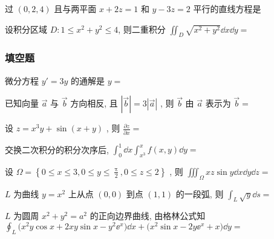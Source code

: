 \begin{ti}
	过 $(0,2,4)$ 且与两平面 $x+2z=1$ 和 $y-3z=2$ 平行的直线方程是 \kuo
\end{ti}

\begin{ti}
	设积分区域 $D: 1 \leqslant x^2 + y^2 \leqslant 4$, 则二重积分 $\iint_D \sqrt{x^2 + y^2} \dd{x} \dd{y} = $ \kuo
\end{ti}

\subsubsection{填空题}
\begin{ti}
	微分方程 $y'=3y$ 的通解是 $y=$ \hua{}
\end{ti}

\begin{ti}
	已知向量 $\vec{a}$ 与 $\vec{b}$ 方向相反, 且 $\left|\vec{b}\right|=3|\vec{a}|$ , 则 $\vec{b}$ 由 $\vec{a}$ 表示为 $\vec{b}=$ \hua{}
\end{ti}

\begin{ti}
	设 $z=x^3 y+\sin(x+y)$ , 则 $\frac{\partial z}{\partial x}=$ \hua{}
\end{ti}

\begin{ti}
	交换二次积分的积分次序后, $\int_0^1 \dd{x}\int_{x^3}^{x} f(x,y)\dd{y}=$ \hua{}
\end{ti}

\begin{ti}
	设 $\Omega=\left\{ 0\leqslant x\leqslant 3, 0\leqslant y\leqslant \frac{\uppi}{2}, 0\leqslant z\leqslant 2 \right\}$ , 则 $\iiint_{\Omega}xz\sin y\dd{x}\dd{y}\dd{z}=$ \hua{}
\end{ti}

\begin{ti}
	$L$ 为曲线 $y=x^2$ 上从点 $(0,0)$ 到点 $(1,1)$ 的一段弧, 则 $\int_{L}\sqrt{y}\dd{s}=$ \hua{}
\end{ti}

\begin{ti}
	$L$ 为圆周 $x^2+y^2=a^2$ 的正向边界曲线, 由格林公式知 $\oint_{L} \bigl( x^2y\cos x+2xy\sin x-y^2 \ee^x \bigr)\dd{x} + \bigl( x^2\sin x-2y\ee^x + x \bigr)\dd{y}=$ \hua{}
\end{ti}

